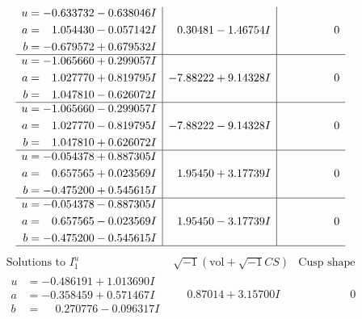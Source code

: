 \documentclass[1p]{elsarticle_modified}
\theoremstyle{definition}
\newcommand{\I}{\sqrt{-1}}
\begin{document}
$$\begin{array}{c|c|c}
\begin{aligned}
u &= -0.633732 - 0.638046 I \\
a &= \phantom{-}1.054430 - 0.057142 I \\
b &= -0.679572 + 0.679532 I\end{aligned}
 & \phantom{-}0.30481 - 1.46754 I & \phantom{-0.000000 } 0 \\ \hline\begin{aligned}
u &= -1.065660 + 0.299057 I \\
a &= \phantom{-}1.027770 + 0.819795 I \\
b &= \phantom{-}1.047810 - 0.626072 I\end{aligned}
 & -7.88222 + 9.14328 I & \phantom{-0.000000 } 0 \\ \hline\begin{aligned}
u &= -1.065660 - 0.299057 I \\
a &= \phantom{-}1.027770 - 0.819795 I \\
b &= \phantom{-}1.047810 + 0.626072 I\end{aligned}
 & -7.88222 - 9.14328 I & \phantom{-0.000000 } 0 \\ \hline\begin{aligned}
u &= -0.054378 + 0.887305 I \\
a &= \phantom{-}0.657565 + 0.023569 I \\
b &= -0.475200 + 0.545615 I\end{aligned}
 & \phantom{-}1.95450 + 3.17739 I & \phantom{-0.000000 } 0 \\ \hline\begin{aligned}
u &= -0.054378 - 0.887305 I \\
a &= \phantom{-}0.657565 - 0.023569 I \\
b &= -0.475200 - 0.545615 I\end{aligned}
 & \phantom{-}1.95450 - 3.17739 I & \phantom{-0.000000 } 0\\
 \hline 
 \end{array}$$\newpage$$\begin{array}{c|c|c}  
\text{Solutions to }I^u_{1}& \I (\text{vol} + \sqrt{-1}CS) & \text{Cusp shape}\\
 \hline 
\begin{aligned}
u &= -0.486191 + 1.013690 I \\
a &= -0.358459 + 0.571467 I \\
b &= \phantom{-}0.270776 - 0.096317 I\end{aligned}
 & \phantom{-}0.87014 + 3.15700 I & \phantom{-0.000000 } 0 \\ \hline\begin{aligned}

\end{aligned}
\end{array}$$
\end{document}
